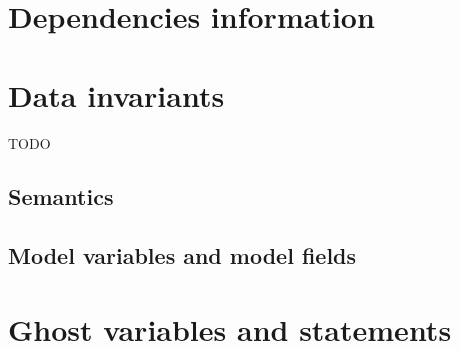 \absent


\section{Dependencies information}
\label{sec:func-dep}

\absent


\section{Data invariants}
\label{sec:invariants}

TODO


\subsection{Semantics}


\subsection{Model variables and model fields}


\section{Ghost variables and statements}
\label{sec:ghost}

